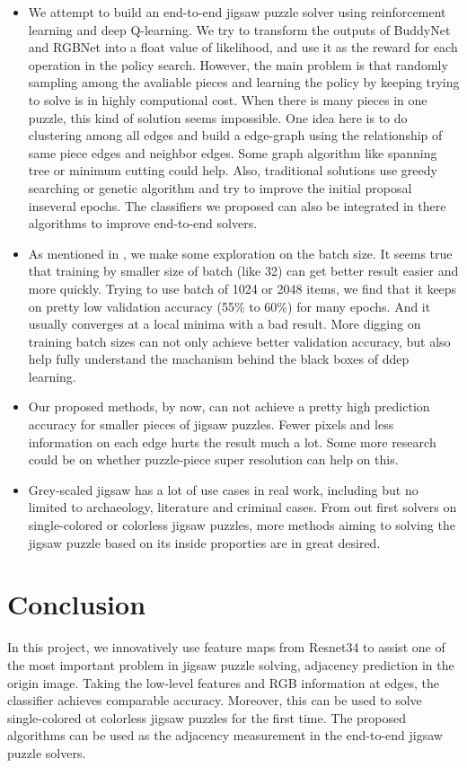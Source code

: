 \documentclass{article}
\begin{document}
\begin{itemize}
    \item We attempt to build an end-to-end jigsaw puzzle solver using reinforcement learning and deep Q-learning. We try to transform the outputs of BuddyNet and RGBNet into a float value of likelihood, and use it as the reward for each operation in the policy search. However, the main problem is that randomly sampling among the avaliable pieces and learning the policy by keeping trying to solve is in highly computional cost. When there is many pieces in one puzzle, this kind of solution seems impossible. One idea here is to do clustering among all edges and build a edge-graph using the relationship of same piece edges and neighbor edges. Some graph algorithm like spanning tree or minimum cutting could help. Also, traditional solutions use greedy searching or genetic algorithm and try to improve the initial proposal inseveral epochs. The classifiers we proposed can also be integrated in there algorithms to improve end-to-end solvers.
    \item As mentioned in \cite{masters2018revisiting}, we make some exploration on the batch size. It seems true that training by smaller size of batch (like 32) can get better result easier and more quickly. Trying to use batch of 1024 or 2048 items, we find that it keeps on pretty low validation accuracy (55\% to 60\%) for many epochs. And it usually converges at a local minima with a bad result. More digging on training batch sizes can not only achieve better validation accuracy, but also help fully understand the machanism behind the black boxes of ddep learning.
    \item Our proposed methods, by now, can not achieve a pretty high prediction accuracy for smaller pieces of jigsaw puzzles. Fewer pixels  and less information on each edge hurts the result much a lot. Some more research could be on whether puzzle-piece super resolution can help on this.
    \item Grey-scaled jigsaw has a lot of use cases in real work, including but no limited to archaeology, literature and criminal cases. From out first solvers on single-colored or colorless jigsaw puzzles, more methods aiming to solving the jigsaw puzzle based on its inside proporties are in great desired.
\end{itemize}

\section{Conclusion}

In this project, we innovatively use feature maps from Resnet34 to assist one of the most important problem in jigsaw puzzle solving, adjacency prediction in the origin image. Taking the low-level features and RGB information at edges, the classifier achieves comparable accuracy. Moreover, this can be used to solve single-colored ot colorless jigsaw puzzles for the first time. The proposed algorithms can be used as the adjacency measurement in the end-to-end jigsaw puzzle solvers.



\end{document}
